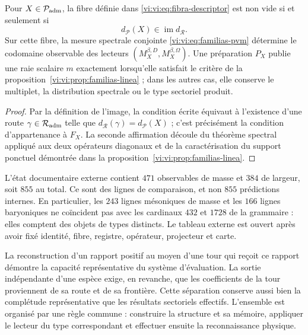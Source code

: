 \begin{proposition}
\label{vi:vi:prop:producto-fibrado-especie-ruta}
Pour \(X\in\mathcal P_{\rm adm}\), la fibre définie dans
\eqref{vi:vi:eq:fibra-descriptor} est non vide si et seulement si
\[
 d_{\mathcal P}(X)\in\operatorname{im}d_{\mathcal R}.
\]
Sur cette fibre, la mesure spectrale conjointe
\eqref{vi:vi:eq:familias-pvm} détermine le codomaine observable des lecteurs
\((M_X^{\beta,D},M_X^{\beta,\Omega})\). Une préparation \(P_X\) publie une
raie scalaire \(m\) exactement lorsqu'elle satisfait le critère de la
proposition~\ref{vi:vi:prop:familias-linea} ; dans les autres cas, elle conserve le
multiplet, la distribution spectrale ou le type sectoriel produit.
\end{proposition}
\begin{proof}
Par la définition de l’image, la condition écrite équivaut à l’existence
d’une route \(\gamma\in\mathcal R_{\rm adm}\) telle que
\(d_{\mathcal R}(\gamma)=d_{\mathcal P}(X)\) ; c’est précisément la
condition d’appartenance à \(F_X\). La seconde affirmation découle du théorème
spectral appliqué aux deux opérateurs diagonaux et de la caractérisation
du support ponctuel démontrée dans la
proposition~\ref{vi:vi:prop:familias-linea}.
\end{proof}

L'état documentaire externe contient \(471\) observables de masse et
\(384\) de largeur, soit \(855\) au total. Ce sont des lignes de comparaison, et non
\(855\) prédictions internes. En particulier, les \(243\) lignes
mésoniques de masse et les \(166\) lignes baryoniques ne coïncident pas avec les cardinaux
\(432\) et \(1728\) de la grammaire : elles comptent des objets de types distincts.
Le tableau externe est ouvert après avoir fixé identité, fibre, registre,
opérateur, projecteur et carte.

La reconstruction d’un rapport positif au moyen d’une tour qui reçoit
ce rapport démontre la capacité représentative du système d’évaluation.
La sortie indépendante d’une espèce exige, en revanche, que les
coefficients de la tour proviennent de sa route et de sa frontière. Cette
séparation conserve aussi bien la complétude représentative que les
résultats sectoriels effectifs. L’ensemble est organisé par une
règle commune : construire la structure et sa mémoire, appliquer le lecteur
du type correspondant et effectuer ensuite la reconnaissance physique.

